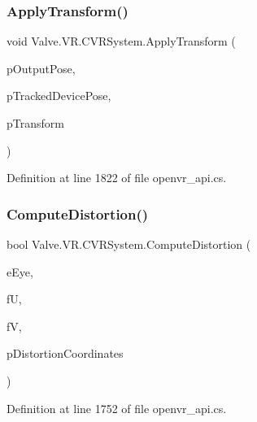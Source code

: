 \subsubsection{\texorpdfstring{ApplyTransform()}{ApplyTransform()}}
{\footnotesize\ttfamily void Valve.\+V\+R.\+C\+V\+R\+System.\+Apply\+Transform (\begin{DoxyParamCaption}\item[{ref \mbox{\hyperlink{struct_valve_1_1_v_r_1_1_tracked_device_pose__t}{Tracked\+Device\+Pose\+\_\+t}}}]{p\+Output\+Pose,  }\item[{ref \mbox{\hyperlink{struct_valve_1_1_v_r_1_1_tracked_device_pose__t}{Tracked\+Device\+Pose\+\_\+t}}}]{p\+Tracked\+Device\+Pose,  }\item[{ref \mbox{\hyperlink{struct_valve_1_1_v_r_1_1_hmd_matrix34__t}{Hmd\+Matrix34\+\_\+t}}}]{p\+Transform }\end{DoxyParamCaption})}



Definition at line 1822 of file openvr\+\_\+api.\+cs.

\mbox{\label{class_valve_1_1_v_r_1_1_c_v_r_system_a9df1c714a1b2d358f98a4028122ccedb}} 
\subsubsection{\texorpdfstring{ComputeDistortion()}{ComputeDistortion()}}
{\footnotesize\ttfamily bool Valve.\+V\+R.\+C\+V\+R\+System.\+Compute\+Distortion (\begin{DoxyParamCaption}\item[{\mbox{\hyperlink{namespace_valve_1_1_v_r_a8153d4a3e627e1cede046327087c1880}{E\+V\+R\+Eye}}}]{e\+Eye,  }\item[{float}]{fU,  }\item[{float}]{fV,  }\item[{ref \mbox{\hyperlink{struct_valve_1_1_v_r_1_1_distortion_coordinates__t}{Distortion\+Coordinates\+\_\+t}}}]{p\+Distortion\+Coordinates }\end{DoxyParamCaption})}



Definition at line 1752 of file openvr\+\_\+api.\+cs.

\mbox{\label{class_valve_1_1_v_r_1_1_c_v_r_system_acf1684d0053050eb05eb90e912900142}} 
